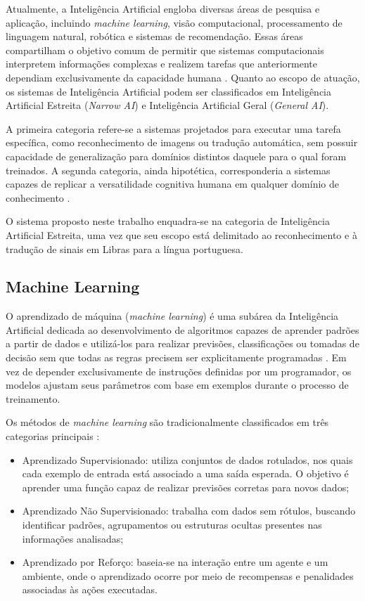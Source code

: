 \documentclass[
    12pt,                %
    openright,           %
    oneside,             %
    a4paper,             %
    english,             %
    brazil               %
]{abntex2}
\begin{document}
Atualmente, a Inteligência Artificial engloba diversas áreas de pesquisa e aplicação, incluindo \textit{machine learning}, visão computacional, processamento de linguagem natural, robótica e sistemas de recomendação. Essas áreas compartilham o objetivo comum de permitir que sistemas computacionais interpretem informações complexas e realizem tarefas que anteriormente dependiam exclusivamente da capacidade humana \cite{russell2021}.
Quanto ao escopo de atuação, os sistemas de Inteligência Artificial podem ser classificados em Inteligência Artificial Estreita (\textit{Narrow AI}) e Inteligência Artificial Geral (\textit{General AI}). 

A primeira categoria refere-se a sistemas projetados para executar uma tarefa específica, como reconhecimento de imagens ou tradução automática, sem possuir capacidade de generalização para domínios distintos daquele para o qual foram treinados. A segunda categoria, ainda hipotética, corresponderia a sistemas capazes de replicar a versatilidade cognitiva humana em qualquer domínio de conhecimento \cite{russell2021}. 

O sistema proposto neste trabalho enquadra-se na categoria de Inteligência Artificial Estreita, uma vez que seu escopo está delimitado ao reconhecimento e à tradução de sinais em Libras para a língua portuguesa.

\subsection{Machine Learning}

O aprendizado de máquina (\textit{machine learning}) é uma subárea da Inteligência Artificial dedicada ao desenvolvimento de algoritmos capazes de aprender padrões a partir de dados e utilizá-los para realizar previsões, classificações ou tomadas de decisão sem que todas as regras precisem ser explicitamente programadas \cite{mitchell1997, faceli2021}. Em vez de depender exclusivamente de instruções definidas por um programador, os modelos ajustam seus parâmetros com base em exemplos durante o processo de treinamento.

Os métodos de \textit{machine learning} são tradicionalmente classificados em três categorias principais \cite{geron2022, oracle_machine_learning}:

\begin{itemize}
    \item Aprendizado Supervisionado: utiliza conjuntos de dados rotulados, nos quais cada exemplo de entrada está associado a uma saída esperada. O objetivo é aprender uma função capaz de realizar previsões corretas para novos dados;
    \item Aprendizado Não Supervisionado: trabalha com dados sem rótulos, buscando identificar padrões, agrupamentos ou estruturas ocultas presentes nas informações analisadas;
    \item Aprendizado por Reforço: baseia-se na interação entre um agente e um ambiente, onde o aprendizado ocorre por meio de recompensas e penalidades associadas às ações executadas.
\end{itemize}
\end{document}
